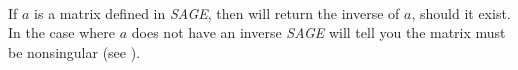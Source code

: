 \contributedby{\stevecanfield}\\
If $a$ is a matrix defined in {\sl SAGE}, then  will return the inverse of $a$, should it exist.  In the case where $a$ does not have an inverse {\sl SAGE} will tell you the matrix must be nonsingular (see ).